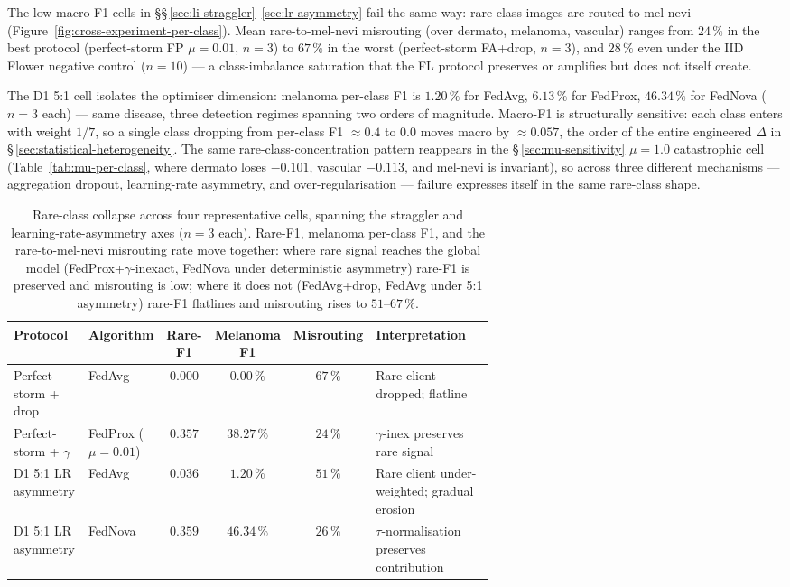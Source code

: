 \documentclass[11pt,a4paper]{report}
\begin{document}
The low-macro-F1 cells in \S\S\,\ref{sec:li-straggler}--\ref{sec:lr-asymmetry}
fail the same way: rare-class images are routed to mel-nevi
(Figure~\ref{fig:cross-experiment-per-class}). Mean rare-to-mel-nevi
misrouting (over dermato, melanoma, vascular) ranges from $24\,\%$ in the
best protocol (perfect-storm FP $\mu = 0.01$, $n=3$) to $67\,\%$ in the
worst (perfect-storm FA+drop, $n=3$), and $28\,\%$ even under the IID
Flower negative control ($n=10$) --- a class-imbalance saturation that the
FL protocol preserves or amplifies but does not itself create.

The D1 5:1 cell isolates the optimiser dimension: melanoma per-class F1 is
$1.20\,\%$ for FedAvg, $6.13\,\%$ for FedProx, $46.34\,\%$ for FedNova
($n=3$ each) --- same disease, three detection regimes spanning two orders
of magnitude. Macro-F1 is structurally sensitive: each class enters with
weight $1/7$, so a single class dropping from per-class F1 $\approx 0.4$ to
$0.0$ moves macro by $\approx 0.057$, the order of the entire engineered
$\Delta$ in \S\,\ref{sec:statistical-heterogeneity}. The same
rare-class-concentration pattern reappears in the
\S\,\ref{sec:mu-sensitivity} $\mu = 1.0$ catastrophic cell
(Table~\ref{tab:mu-per-class}, where dermato loses $-0.101$, vascular
$-0.113$, and mel-nevi is invariant), so across three different mechanisms
--- aggregation dropout, learning-rate asymmetry, and over-regularisation
--- failure expresses itself in the same rare-class shape.

\begin{table}[H]
\centering
\small
\caption{Rare-class collapse across four representative cells, spanning the
straggler and learning-rate-asymmetry axes ($n=3$ each). Rare-F1, melanoma
per-class F1, and the rare-to-mel-nevi misrouting rate move together: where
rare signal reaches the global model (FedProx+$\gamma$-inexact, FedNova under
deterministic asymmetry) rare-F1 is preserved and misrouting is low; where it
does not (FedAvg+drop, FedAvg under 5:1 asymmetry) rare-F1 flatlines and
misrouting rises to $51$--$67\,\%$.}
\label{tab:collapse-cells}
\begin{tabular}{p{0.16\linewidth} p{0.14\linewidth} c c c p{0.32\linewidth}}
\hline
Protocol                  & Algorithm & Rare-F1 & Melanoma F1 & Misrouting & Interpretation \\
\hline
Perfect-storm + drop      & FedAvg    & $0.000$ & $0.00\,\%$  & $67\,\%$   & Rare client dropped; flatline \\
Perfect-storm + $\gamma$  & FedProx ($\mu=0.01$) & $0.357$ & $38.27\,\%$ & $24\,\%$ & $\gamma$-inex preserves rare signal \\
D1 5:1 LR asymmetry       & FedAvg    & $0.036$ & $1.20\,\%$  & $51\,\%$   & Rare client under-weighted; gradual erosion \\
D1 5:1 LR asymmetry       & FedNova   & $0.359$ & $46.34\,\%$ & $26\,\%$   & $\tau$-normalisation preserves contribution \\
\hline
\end{tabular}
\end{table}
\end{document}
